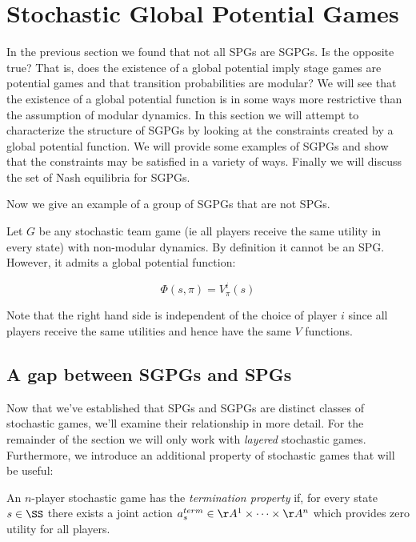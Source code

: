 \section{Stochastic Global Potential Games}
\label{sec:spg}

In the previous section we found that not all SPGs are SGPGs. Is the opposite true? That is, does the existence of a global potential imply stage games are potential games and that transition probabilities are modular? We will see that the existence of a global potential function is in some ways more restrictive than the assumption of modular dynamics. In this section we will attempt to characterize the structure of SGPGs by looking at the constraints created by a global potential function. We will provide some examples of SGPGs and show that the constraints may be satisfied in a variety of ways. Finally we will discuss the set of Nash equilibria for SGPGs. 

Now we give an example of a group of SGPGs that are not SPGs.

\begin{eg}
Let $G$ be any stochastic team game (ie all players receive the same utility in every state) with non-modular dynamics. By definition it cannot be an SPG. However, it admits a global potential function:

$$
\Phi(s, \pi) = V^i_{\pi}(s)
$$

Note that the right hand side is independent of the choice of player $i$ since all players receive the same utilities and hence have the same $V$ functions.
\end{eg}

\subsection{A gap between SGPGs and SPGs}

Now that we've established that SPGs and SGPGs are distinct classes of stochastic games, we'll examine their relationship in more detail. For the remainder of the section we will only work with {\em layered} stochastic games. Furthermore, we introduce an additional property of stochastic games that will be useful:

\begin{mydef}
An $n$-player stochastic game has the {\em termination property} if, for every state $s \in \SS$ there exists a joint action $a^{term}_s \in \AA^1 \times \cdots \times \AA^n$ which provides zero utility for all players.
\end{mydef}

